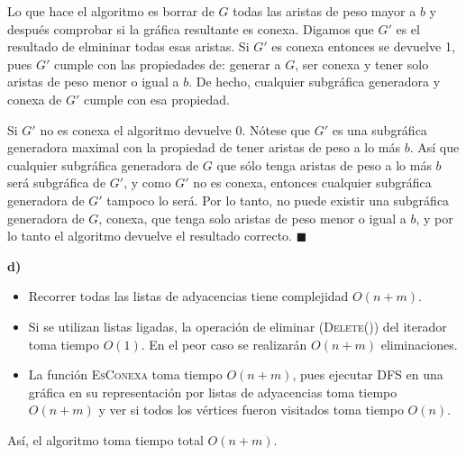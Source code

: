 \documentclass{article}
\begin{document}
Lo que hace el algoritmo es borrar de $G$ todas las aristas de peso mayor a $b$ y después comprobar si la gráfica resultante es conexa. Digamos que $G'$ es el resultado de elmininar todas esas aristas. Si $G'$ es conexa entonces se devuelve 1, pues $G'$ cumple con las propiedades de: generar a $G$, ser conexa y tener solo aristas de peso menor o igual a $b$. De hecho, cualquier subgráfica generadora y conexa de $G'$ cumple con esa propiedad.

Si $G'$ no es conexa el algoritmo devuelve 0. Nótese que $G'$ es una subgráfica generadora maximal con la propiedad de tener aristas de peso a lo más $b$. Así que cualquier subgráfica generadora de $G$ que sólo tenga aristas de peso a lo más $b$ será subgráfica de $G'$, y como $G'$ no es conexa, entonces cualquier subgráfica generadora de $G'$ tampoco lo será. Por lo tanto, no puede existir una subgráfica generadora de $G$, conexa, que tenga solo aristas de peso menor o igual a $b$, y por lo tanto el algoritmo devuelve el resultado correcto. $\blacksquare$

\textbf{d)}

\begin{itemize}
\item Recorrer todas las listas de adyacencias tiene complejidad $O(n+m)$.
\item Si se utilizan listas ligadas, la operación de eliminar (\textsc{Delete()}) del iterador toma tiempo $O(1)$. En el peor caso se realizarán $O(n+m)$ eliminaciones.
\item La función \textsc{EsConexa} toma tiempo $O(n+m)$, pues ejecutar DFS en una gráfica en su representación por listas de adyacencias toma tiempo $O(n+m)$ y ver si todos los vértices fueron visitados toma tiempo $O(n)$.
\end{itemize}

Así, el algoritmo toma tiempo total $O(n+m)$.
\end{document}
